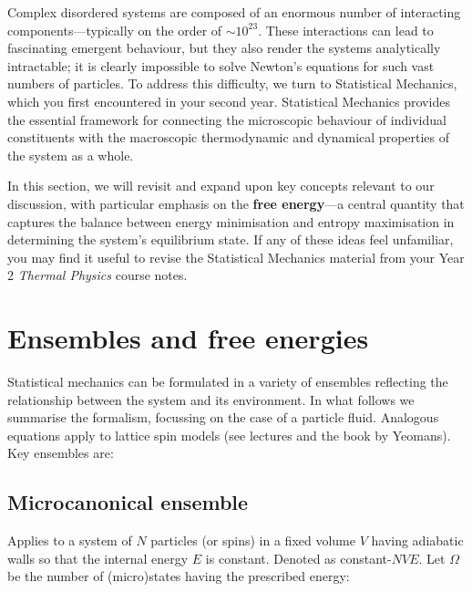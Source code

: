 \documentclass[
  letterpaper,
  DIV=11,
  numbers=noendperiod]{scrreprt}
\begin{document}
Complex disordered systems are composed of an enormous number of
interacting components---typically on the order of \(\sim 10^{23}\).
These interactions can lead to fascinating emergent behaviour, but they
also render the systems analytically intractable; it is clearly
impossible to solve Newton's equations for such vast numbers of
particles. To address this difficulty, we turn to Statistical Mechanics,
which you first encountered in your second year. Statistical Mechanics
provides the essential framework for connecting the microscopic
behaviour of individual constituents with the macroscopic thermodynamic
and dynamical properties of the system as a whole.

In this section, we will revisit and expand upon key concepts relevant
to our discussion, with particular emphasis on the \textbf{free
energy}---a central quantity that captures the balance between energy
minimisation and entropy maximisation in determining the system's
equilibrium state. If any of these ideas feel unfamiliar, you may find
it useful to revise the Statistical Mechanics material from your Year 2
\emph{Thermal Physics} course notes.

\section*{Ensembles and free
energies}\label{ensembles-and-free-energies}


Statistical mechanics can be formulated in a variety of ensembles
reflecting the relationship between the system and its environment. In
what follows we summarise the formalism, focussing on the case of a
particle fluid. Analogous equations apply to lattice spin models (see
lectures and the book by Yeomans). Key ensembles are:

\subsection*{Microcanonical ensemble}\label{microcanonical-ensemble}

Applies to a system of \(N\) particles (or spins) in a fixed volume
\(V\) having adiabatic walls so that the internal energy \(E\) is
constant. Denoted as constant-\(NVE\). Let \(\Omega\) be the number of
(micro)states having the prescribed energy:
\end{document}
